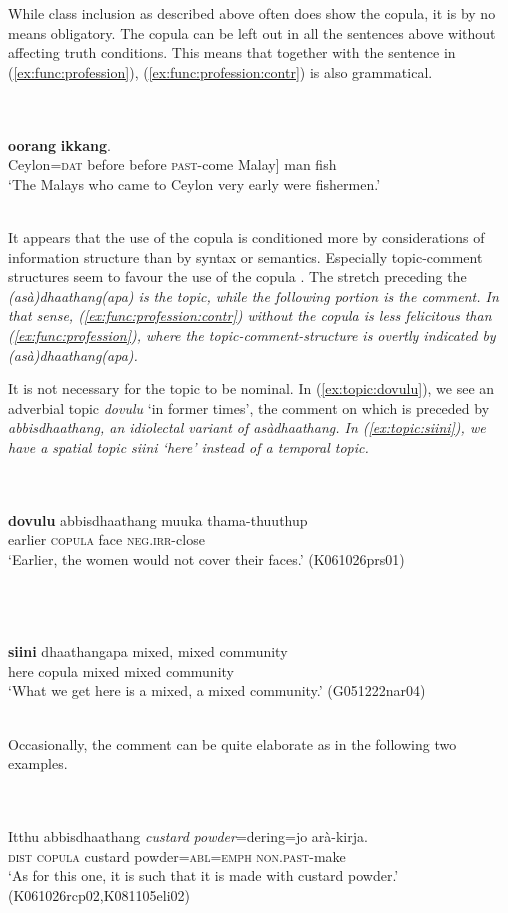 \documentclass[a4paper,12pt]{article}
\newcommand{\xbox}[2]{\noindent\parbox[t]{#1}{#2}\noindent}
\newcommand{\xref}[1]{(\ref{#1})}
\newcommand{\trs}[2]{{\em #1\em} `#2'}
\newcommand{\ea}{\\\\}
\newcommand{\z}{\\\\}
\begin{document}
While class inclusion as described above often does show the copula, it is by no means obligatory. The copula can be left out in all the sentences above without affecting truth conditions. This means that together with the sentence in  \xref{ex:func:profession}, \xref{ex:func:profession:contr} is also grammatical.

\xbox{\textwidth}{
\ea\label{ex:func:profession:contr}
\gll [Seelong=nang  duppang duppang anà-dhaathang  mlaayu] \zero{}  \textbf{oorang} \textbf{ikkang}. \\
      Ceylon=\textsc{dat} before before \textsc{past}-come Malay] {  }  man fish \\
    `The Malays who came to Ceylon very early were fishermen.'  
\z
}


It appears that the use of the copula is conditioned more by considerations of information structure than by syntax or semantics. Especially topic-comment structures seem to favour the use of the copula \citep[cf.][420]{LiEtAl1977cop}. The stretch preceding the \em (asà)dhaathang(apa) \em is the topic, while the following portion is the comment. In that sense, \xref{ex:func:profession:contr} without the copula is less felicitous than \xref{ex:func:profession}, where the topic-comment-structure is overtly indicated by \em (asà)dhaathang(apa)\em.


It is not necessary for the topic to be nominal. In \xref{ex:topic:dovulu}, we see an adverbial topic \trs{dovulu}{in former times}, the comment on which is preceded by \em abbisdhaathang\em, an idiolectal variant of \em asàdhaathang\em. In \xref{ex:topic:siini}, we have a spatial topic \trs{siini}{here} instead of a temporal topic.


\xbox{\textwidth}{
\ea\label{ex:topic:dovulu}
\gll \textbf{dovulu} abbisdhaathang       muuka thama-thuuthup \\
     earlier \textsc{copula} face \textsc{neg.irr}-close  \\
    `Earlier, the women would not cover their faces.' (K061026prs01)
\z
} 

\xbox{\textwidth}{
\ea\label{ex:topic:siini}
\gll \textbf{siini} dhaathangapa mixed, mixed community \\
     here copula mixed mixed community  \\
    `What we get here is a mixed, a mixed community.' (G051222nar04)
\z
} 


Occasionally, the comment can be quite elaborate as in the following two examples.

\xbox{\textwidth}{
\ea\label{ex:form:copula:special:missingargument2}
\gll Itthu abbisdhaathang {\em custard} {\em powder}=dering=jo arà-kirja. \\ %
      \textsc{dist} \textsc{copula} custard powder=\textsc{abl}=\textsc{emph} \textsc{non.past}-make \\
    `As for this one, it is such that it is made with custard powder.' (K061026rcp02,K081105eli02)
\z
}
\end{document}
